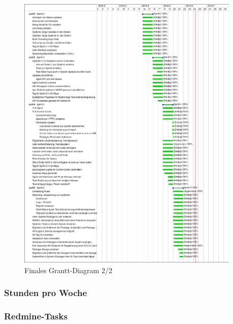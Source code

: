 \begin{figure}
  \centering
    \includegraphics[width=0.95\textwidth]{fig/upd89-gantt-part2}
  \caption{Finales  Grantt-Diagram 2/2}
  \label{fig:gantt-final2}
\end{figure}


\subsubsection*{Stunden pro Woche}

\subsubsection*{Redmine-Tasks}

